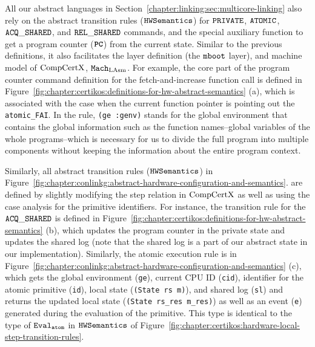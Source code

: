 All our abstract languages in Section~\ref{chapter:linking:sec:multicore-linking} 
also rely on the abstract transition rules (${\mathrm{\texttt{HWSemantics}}}$) for 
${{\mathrm{\texttt{PRIVATE}}}}$, ${{\mathrm{\texttt{ATOMIC}}}}$, ${{\mathrm{\texttt{ACQ}}}\_{\mathrm{\texttt{SHARED}}}}$, and ${{\mathrm{\texttt{REL}}}\_{\mathrm{\texttt{SHARED}}}}$ commands, and the special auxiliary function to get a program counter (${{\mathrm{\texttt{\textbf{PC}}}}}$) from the current state.
Similar to the previous definitions, 
it also facilitates the layer definition (the ${\mathrm{\texttt{mboot}}}$ layer), 
and machine model of $\mathrm{CompCertX}$, ${\mathrm{\texttt{Mach}}}_{\mathrm{LAsm}}$.
For example, the core part of the program counter command definition for the fetch-and-increase function call is defined in Figure~\ref{fig:chapter:certikos:definitions-for-hw-abstract-semantics} (a), which is associated with the case when the current function pointer is pointing out the \lstinline$atomic_FAI$. 
In the rule, \lstinline$(ge :genv)$ stands for the global environment that contains the 
global information such as the function names--global variables of the whole programs--which 
is necessary for us to divide the full program into multiple components without keeping the information 
about the entire program context.

Similarly, all abstract transition rules   (${\mathrm{\texttt{HWSemantics}}}$)  in  Figure~\ref{fig:chapter:conlinkg:abstract-hardware-configuration-and-semantics}.
are defined 
by slightly modifying the step relation in $\mathrm{CompCertX}$ as well as  using the case analysis for the primitive identifiers. 
For instance, the transition rule for the ${{\mathrm{\texttt{ACQ}}}\_{\mathrm{\texttt{SHARED}}}}$ is defined in Figure~\ref{fig:chapter:certikos:definitions-for-hw-abstract-semantics} (b), which updates the program counter in the private state
and  updates the shared log (note that the shared log is a part of our abstract state in our implementation).
Similarly, the atomic execution rule is in Figure~\ref{fig:chapter:conlinkg:abstract-hardware-configuration-and-semantics} (c),
which gets the global environment (\lstinline$ge$), current CPU ID (\lstinline$cid$),  identifier for the atomic primitive
(\lstinline$id$),  local state (\lstinline$(State rs m)$),
and  shared log (\lstinline$sl$) and returns the updated local state (\lstinline$(State rs_res m_res)$) as well as an event (\lstinline$e$) generated during the evaluation of the primitive.
This type is identical to the type of ${{\mathrm{\texttt{Eval}}}_{{\mathrm{\texttt{atom}}}}}$ in ${\mathrm{\texttt{HWSemantics}}}$ of Figure~\ref{fig:chapter:certikos:hardware-local-step-transition-rules}.


